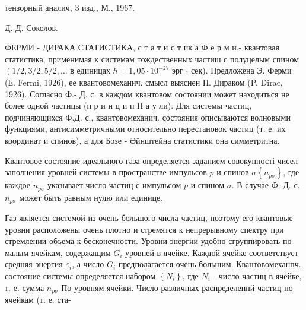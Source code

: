 \documentclass[10pt]{article}
\begin{document}
тензорный аналич, 3 изд., М., 1967.

Д. Д. Соколов.



ФЕРМИ - ДИРАКА СТАТИСТИКА, с т а т и с т ик а Ф е р м и,- квантовая статистика, применимая к системам тождественных частиш с полуцелым спином $\left(1 / 2,3 / 2,5 / 2, \ldots\right.$ в единицах $\hbar=1,05 \cdot 10^{-27}$ эрг $\cdot$ сек). Предложена Э. Ферми (Е. Fermi, 1926), ее квантовомеханич. смысл выяснен П. Дираком (P. Dirac, 1926). Согласно Ф.- Д. с. в каждом квантовом состоянии может находиться не более одной частицы (п р и н ц и п П а у ли). Для системы частиц, подчиняющихся Ф.Д. с., квантовомеханич. состояния описываются волновыми функциями, антисимметричными относительно перестановок частиц (т. е. их координат и спинов), а для Бозе - Әйнштейна статистики она симметритна.



Квантовое состояние идеального газа определяется заданием совокупності чисел заполнения уровней системы в пространстве импульсов $p$ и спинов $\sigma\left\{n_{p \sigma}\right\}$, где каждое $n_{p \sigma}$ указывает число частиц с импульсом $p$ и спином $\sigma$. В случае Ф.-Д. с. $n_{p \sigma}$ может быть равным нулю или единице.



Газ является системой из очень большого числа частиц, поэтому его квантовые уровни расположены очень плотно и стремятся к непрерывному спектру при стремлении объема к бесконечности. Уровни энергии удобно сгруппировать по малым ячейкам, содержащим $G_{i}$ уровней в ячейке. Каждой ячейке соответствует средняя энергия $\varepsilon_{i}$, а число $G_{i}$ предполагается очень большим. Квантовомеханпч. состояние системы определяется набором $\left\{N_{i}\right\}$, где $N_{i}$ - число частиц в ячейке, т. е. сумма $n_{p \sigma}$ По уровням ячейки. Число различных распределенпй частиц по ячейкам (т. е. ста-
\end{document}
